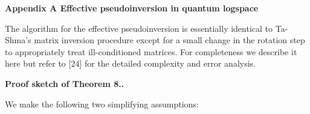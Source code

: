 \documentclass[10pt,a4paper]{article}
\begin{document}
\par\medskip\noindent\textbf{
Appendix A Effective pseudoinversion in quantum logspace}\par




The algorithm for the effective pseudoinversion is essentially identical to Ta-Shma’s matrix inversion procedure except for a small change in the rotation step to appropriately treat ill-conditioned matrices.
For completeness we describe it here but refer to [24] for the detailed complexity and error analysis.\par




\par\medskip\noindent\textbf{Proof sketch of Theorem 8..}\par




We make the following two simplifying assumptions:\par
\end{document}
